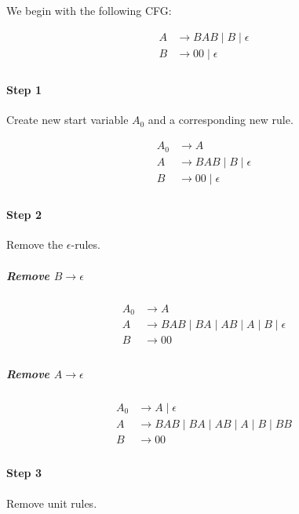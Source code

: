 \documentclass{article}
\begin{document}
We begin with the following CFG:

\begin{align*}
	A & \longrightarrow BAB \;|\; B \;|\; \epsilon \\
	B & \longrightarrow 00 \;|\; \epsilon          \\
\end{align*}

\paragraph{Step 1} Create new start variable $A_0$ and a corresponding new rule.

\begin{align*}
	A_0 & \longrightarrow A                          \\
	A   & \longrightarrow BAB \;|\; B \;|\; \epsilon \\
	B   & \longrightarrow 00 \;|\; \epsilon          \\
\end{align*}

\paragraph{Step 2} Remove the $\epsilon$-rules.

\subparagraph{Remove $B \longrightarrow \epsilon$}

\begin{align*}
	A_0 & \longrightarrow A                                                    \\
	A   & \longrightarrow BAB \;|\; BA \;|\; AB \;|\; A \;|\; B \;|\; \epsilon \\
	B   & \longrightarrow 00                                                   \\
\end{align*}

\subparagraph{Remove $A \longrightarrow \epsilon$}

\begin{align*}
	A_0 & \longrightarrow A \;|\; \epsilon                               \\
	A   & \longrightarrow BAB \;|\; BA \;|\; AB \;|\; A \;|\; B \;|\; BB \\
	B   & \longrightarrow 00                                             \\
\end{align*}

\paragraph{Step 3} Remove unit rules.
\end{document}
